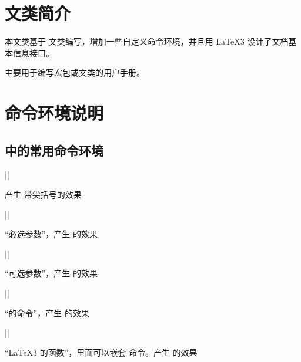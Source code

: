 \documentclass{xdyy-usermanual}
\begin{document}
\maketitle
\tableofcontents


\section{文类简介}
本文类基于  文类编写，增加一些自定义命令环境，并且用 \LaTeX3 设计了文档基本信息接口。

主要用于编写宏包或文类的用户手册。


\section{命令环境说明}


\subsection{  中的常用命令环境 }

\begin{function}{\meta}
  \begin{syntax}
    ||
  \end{syntax}
  产生  带尖括号的效果
\end{function}

\begin{function}{\marg}
  \begin{syntax}
    ||
  \end{syntax}
  “必选参数”，产生  的效果
\end{function}

\begin{function}{\oarg}
  \begin{syntax}
    ||
  \end{syntax}
  “可选参数”，产生  的效果
\end{function}



\begin{function}{\tn}
  \begin{syntax}
    ||
  \end{syntax}
  “\LaTeXe{}的命令”，产生  的效果
\end{function}

\begin{function}{\cs}
  \begin{syntax}
    ||
  \end{syntax}
  “\LaTeX3 的函数”，里面可以嵌套  命令。产生  的效果
  \begin{hexample}
  \end{hexample}
\end{function}
\end{document}
